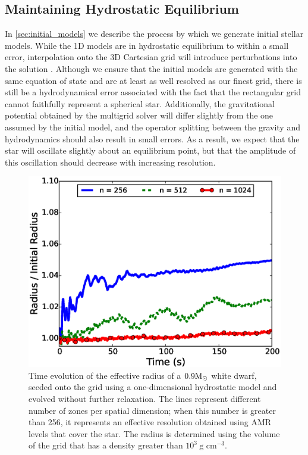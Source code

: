 \documentclass[12pt]{article}
\begin{document}
\subsection{Maintaining Hydrostatic Equilibrium}
\label{sec:HSE}

In \autoref{sec:initial_models} we describe the process by which
we generate initial stellar models. While the 1D models are in
hydrostatic equilibrium to within a small error, interpolation onto
the 3D Cartesian grid will introduce perturbations into the solution
\citep{zingale:2002}. Although we ensure that the initial models are
generated with the same equation of state and are at least as well resolved as
our finest grid, there is still be a hydrodynamical error associated
with the fact that the rectangular grid cannot faithfully represent a
spherical star. Additionally, the gravitational potential obtained by
the multigrid solver will differ slightly from the one assumed by the
initial model, and the operator splitting between the gravity and
hydrodynamics should also result in small errors. As a result, we
expect that the star will oscillate slightly about an equilibrium
point, but that the amplitude of this oscillation should decrease with
increasing resolution.

\begin{figure}[h!]
  \centering
  \includegraphics[scale=0.8,trim=0.15in 0.0in 0.55in 0.5in,clip]{plots/single_star_static_1e3_radius}
  \caption[Effective radius evolution of a static white dwarf]
          {Time evolution of the effective radius of a $0.9 \mathrm{M}_\odot$ 
           white dwarf, seeded onto the grid using a one-dimensional hydrostatic
           model and evolved without further relaxation. The lines represent 
           different number of zones per spatial dimension; when this number is 
           greater than 256, it represents an effective resolution obtained 
           using AMR levels that cover the star. The radius is determined 
           using the volume of the grid that has a density greater than $10^3\ \text{g cm}^{-3}.$
           \label{fig:single_star_static_radius}}
\end{figure}
\end{document}
